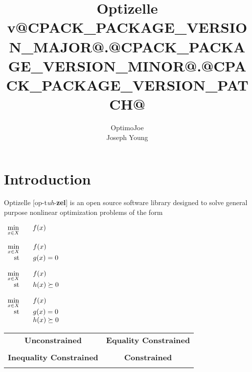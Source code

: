\documentclass{report}
\title{Optizelle v@CPACK_PACKAGE_VERSION_MAJOR@.@CPACK_PACKAGE_VERSION_MINOR@.@CPACK_PACKAGE_VERSION_PATCH@}
\author{OptimoJoe\\Joseph Young}
\newcommand{\st}{\textnormal{st}}
\begin{document}
\maketitle
\tableofcontents

\chapter{Introduction}

        Optizelle [op-t\textit{\!uh}-{\bf zel}] is an open source software library designed to solve general purpose nonlinear optimization problems of the form
    \begin{lrbox}{\boxUnconstrained}
        $\begin{array}[t]{rcl}
            \min\limits_{x\in X} && f(x)
        \end{array}$
    \end{lrbox}
    \begin{lrbox}{\boxEqualityConstrained}
        $\begin{array}[t]{rcl}
            \min\limits_{x\in X} && f(x)\\
            \st && g(x)=0
        \end{array}$
    \end{lrbox}
    \begin{lrbox}{\boxInequalityConstrained}
        $\begin{array}[t]{rcl}
            \min\limits_{x\in X} && f(x)\\
            \st && h(x)\succeq 0
        \end{array}$
    \end{lrbox}
    \begin{lrbox}{\boxConstrained}
        $\begin{array}[t]{rcl}
            \min\limits_{x\in X} && f(x)\\
            \st && g(x)=0\\
                && h(x)\succeq 0
        \end{array}$
    \end{lrbox}
    \begin{lrbox}{\boxOptimizationTypes}
        \begin{tabular}{|l|l|}\hline
            \multicolumn{1}{|c|}{\bf Unconstrained} &
            \multicolumn{1}{c|}{\bf Equality Constrained}\\
            \usebox{\boxUnconstrained} &
            \usebox{\boxEqualityConstrained} \\\hline
            \multicolumn{1}{|c|}{\bf Inequality Constrained} &
            \multicolumn{1}{c|}{\bf Constrained}\\
            \usebox{\boxInequalityConstrained} &
            \usebox{\boxConstrained} \\\hline
        \end{tabular}
    \end{lrbox}
\end{document}
